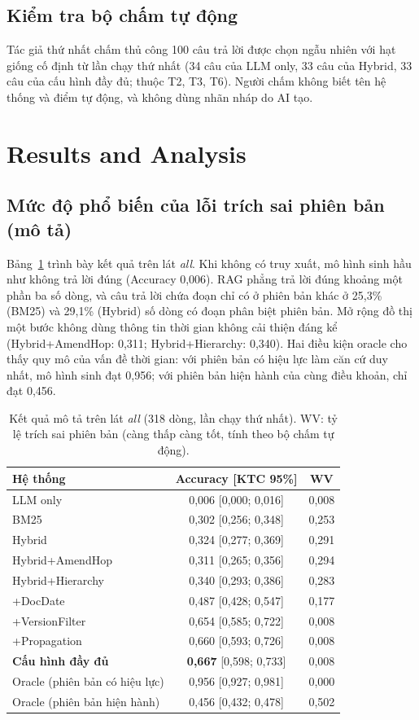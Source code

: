 \documentclass[11pt,a4paper]{article}
\begin{document}
\subsection{Kiểm tra bộ chấm tự động}
Tác giả thứ nhất chấm thủ công 100 câu trả lời được chọn ngẫu nhiên với hạt giống cố định từ lần chạy thứ nhất (34 câu của LLM only, 33 câu của Hybrid, 33 câu của cấu hình đầy đủ; thuộc T2, T3, T6). Người chấm không biết tên hệ thống và điểm tự động, và không dùng nhãn nháp do AI tạo.

\section{Results and Analysis}

\subsection{Mức độ phổ biến của lỗi trích sai phiên bản (mô tả)}
Bảng~\ref{tab:main} trình bày kết quả trên lát \emph{all}. Khi không có truy xuất, mô hình sinh hầu như không trả lời đúng (Accuracy 0,006). RAG phẳng trả lời đúng khoảng một phần ba số dòng, và câu trả lời chứa đoạn chỉ có ở phiên bản khác ở 25,3\% (BM25) và 29,1\% (Hybrid) số dòng có đoạn phân biệt phiên bản. Mở rộng đồ thị một bước không dùng thông tin thời gian không cải thiện đáng kể (Hybrid+AmendHop: 0,311; Hybrid+Hierarchy: 0,340). Hai điều kiện oracle cho thấy quy mô của vấn đề thời gian: với phiên bản có hiệu lực làm căn cứ duy nhất, mô hình sinh đạt 0,956; với phiên bản hiện hành của cùng điều khoản, chỉ đạt 0,456.

\begin{table}[H]
\centering
\small
\caption{Kết quả mô tả trên lát \emph{all} (318 dòng, lần chạy thứ nhất). WV: tỷ lệ trích sai phiên bản (càng thấp càng tốt, tính theo bộ chấm tự động).}
\label{tab:main}
\begin{tabular}{@{}l c c@{}}
\toprule
\textbf{Hệ thống} & \textbf{Accuracy [KTC 95\%]} & \textbf{WV} \\
\midrule
LLM only & 0,006 [0,000; 0,016] & 0,008 \\
BM25 & 0,302 [0,256; 0,348] & 0,253 \\
Hybrid & 0,324 [0,277; 0,369] & 0,291 \\
Hybrid+AmendHop & 0,311 [0,265; 0,356] & 0,294 \\
Hybrid+Hierarchy & 0,340 [0,293; 0,386] & 0,283 \\
+DocDate & 0,487 [0,428; 0,547] & 0,177 \\
+VersionFilter & 0,654 [0,585; 0,722] & 0,008 \\
+Propagation & 0,660 [0,593; 0,726] & 0,008 \\
\textbf{Cấu hình đầy đủ} & \textbf{0,667} [0,598; 0,733] & 0,008 \\
\midrule
Oracle (phiên bản có hiệu lực) & 0,956 [0,927; 0,981] & 0,000 \\
Oracle (phiên bản hiện hành) & 0,456 [0,432; 0,478] & 0,502 \\
\bottomrule
\end{tabular}
\end{table}
\end{document}
